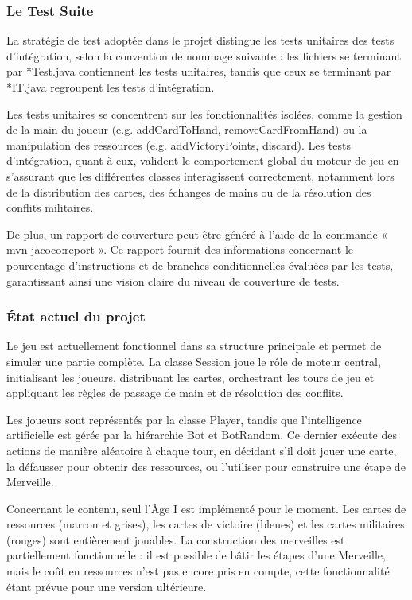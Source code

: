 \subsubsection{Le Test Suite}

La stratégie de test adoptée dans le projet distingue les tests unitaires des tests d’intégration, selon la convention de nommage suivante : les fichiers se terminant par *Test.java contiennent les tests unitaires, tandis que ceux se terminant par *IT.java regroupent les tests d’intégration.

Les tests unitaires se concentrent sur les fonctionnalités isolées, comme la gestion de la main du joueur (e.g. addCardToHand, removeCardFromHand) ou la manipulation des ressources (e.g. addVictoryPoints, discard). Les tests d’intégration, quant à eux, valident le comportement global du moteur de jeu en s’assurant que les différentes classes interagissent correctement, notamment lors de la distribution des cartes, des échanges de mains ou de la résolution des conflits militaires.

De plus, un rapport de couverture peut être généré à l’aide de la commande « mvn jacoco:report ». Ce rapport fournit des informations concernant le pourcentage d’instructions et de branches conditionnelles évaluées par les tests, garantissant ainsi une vision claire du niveau de couverture de tests.

\subsubsection{État actuel du projet}
\label{sec:current-state}

Le jeu est actuellement fonctionnel dans sa structure principale et permet de simuler une partie complète. La classe Session joue le rôle de moteur central, initialisant les joueurs, distribuant les cartes, orchestrant les tours de jeu et appliquant les règles de passage de main et de résolution des conflits.

Les joueurs sont représentés par la classe Player, tandis que l’intelligence artificielle est gérée par la hiérarchie Bot et BotRandom. Ce dernier exécute des actions de manière aléatoire à chaque tour, en décidant s’il doit jouer une carte, la défausser pour obtenir des ressources, ou l’utiliser pour construire une étape de Merveille.

Concernant le contenu, seul l’Âge I est implémenté pour le moment. Les cartes de ressources (marron et grises), les cartes de victoire (bleues) et les cartes militaires (rouges) sont entièrement jouables. La construction des merveilles est partiellement fonctionnelle : il est possible de bâtir les étapes d’une Merveille, mais le coût en ressources n’est pas encore pris en compte, cette fonctionnalité étant prévue pour une version ultérieure.


